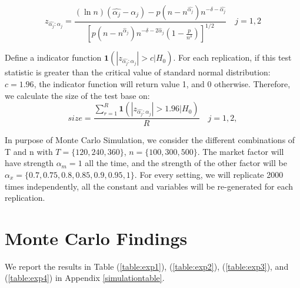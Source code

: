 	\[  z_{\hat{\alpha_j}:\alpha_j} =\frac{(\ln n)\left(\hat{\alpha_j}-\alpha_{j}\right)-p\left(n-n^{\hat{\alpha_j}}\right) n^{-\delta-\hat{\alpha_j}}}{\left[p\left(n-n^{\hat{\alpha}_j}\right) n^{-\delta-2 \hat{\alpha}_j}\left(1-\frac{p}{n^{\delta}}\right)\right]^{1 / 2}}\quad j=1,2 \tag{9}  \label{z_indicator}\]

Define a indicator function $\bm{1}(|z_{\hat{\alpha_j}:\alpha_j} |>c|H_0)$.
For each replication, if this test statistic is greater than the critical value of standard normal distribution: $c = 1.96$, the indicator function will return value 1, and 0 otherwise.
Therefore, we calculate the size of the test base on:
	\[ size = \frac{\sum_{r=1}^{R} \bm{1}(|z_{\hat{\alpha_j}:\alpha_j} |>1.96|H_0)}{R} \quad j =1,2 \tag{10}, \label{size_calculator}\]


In purpose of Monte Carlo Simulation, we consider the different combinations of T and n with $T = \{120, 240, 360\}$, $n =\{100, 300, 500\} $.
The market factor will have strength $\alpha_m = 1$ all the time, and the strength of the other factor will be $\alpha_{x} = \{0.7, 0.75, 0.8,0.85, 0.9,0.95, 1\}$. For every setting, we will replicate 2000 times independently, all the constant and variables will be re-generated for each replication.


 
	\section{Monte Carlo Findings}\label{MC_findings}
We report the results in Table (\ref{table:exp1}), (\ref{table:exp2}), (\ref{table:exp3}), and (\ref{table:exp4}) in Appendix \ref{simulationtable}.

